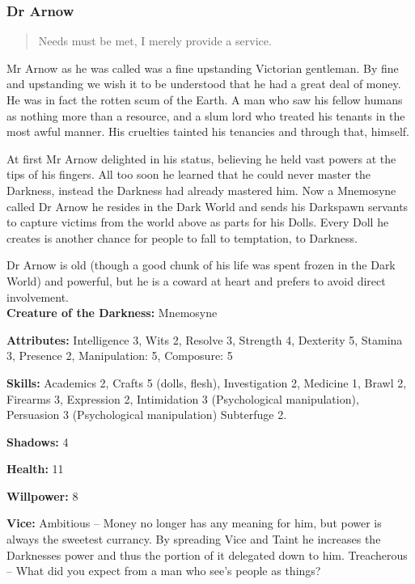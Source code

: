 \subsubsection*{Dr Arnow}

\begin{quote}Needs must be met, I merely provide a service.\end{quote}

Mr Arnow as he was called was a fine upstanding Victorian gentleman. By fine and upstanding we wish it to be understood that he had a great deal of money. He was in fact the rotten scum of the Earth. A man who saw his fellow humans as nothing more than a resource, and a slum lord who treated his tenants in the most awful manner. His cruelties tainted his tenancies and through that, himself.

At first Mr Arnow delighted in his status, believing he held vast powers at the tips of his fingers. All too soon he learned that he could never master the Darkness, instead the Darkness had already mastered him. Now a Mnemosyne called Dr Arnow he resides in the Dark World and sends his Darkspawn servants to capture victims from the world above as parts for his Dolls. Every Doll he creates is another chance for people to fall to temptation, to Darkness.

Dr Arnow is old (though a good chunk of his life was spent frozen in the Dark World) and powerful, but he is a coward at heart and prefers to avoid direct involvement.\\

\noindent \textbf{Creature of the Darkness:} Mnemosyne

\noindent \textbf{Attributes:} Intelligence 3, Wits 2, Resolve 3, Strength 4, Dexterity 5, Stamina 3, Presence 2, Manipulation: 5, Composure: 5

\noindent \textbf{Skills:} Academics 2, Crafts 5 (dolls, flesh), Investigation 2, Medicine 1, Brawl 2, Firearms 3, Expression 2, Intimidation 3 (Psychological manipulation), Persuasion 3 (Psychological manipulation) Subterfuge 2.

\noindent \textbf{Shadows:} 4

\noindent \textbf{Health:} 11

\noindent \textbf{Willpower:} 8

\noindent \textbf{Vice:} Ambitious – Money no longer has any meaning for him, but power is always the sweetest currancy. By spreading Vice and Taint he increases the Darknesses power and thus the portion of it delegated down to him. Treacherous – What did you expect from a man who see's people as things?

